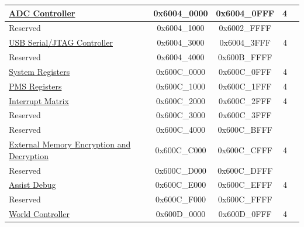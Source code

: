\begin{longtable}[c]{ |p{5cm}|c|c|r|p{1.0cm}| }
                        \hyperref[mod:sensor]{ADC Controller}              & 0x6004\_0000 & 0x6004\_0FFF &   4    &   \\\hline
    \rowcolor{gray!25}  Reserved                    & 0x6004\_1000 & 0x6002\_FFFF &        &   \\\hline
                        \hyperref[mod:usbserialjtag]{USB Serial/JTAG Controller}  & 0x6004\_3000 & 0x6004\_3FFF &   4    &  \\\hline
    \rowcolor{gray!25}  Reserved                    & 0x6004\_4000 & 0x600B\_FFFF &        &   \\\hline
                        
                        \hyperref[mod:sysreg]{System Registers}            & 0x600C\_0000 & 0x600C\_0FFF &   4    &   \\\hline
                        \hyperref[mod:permctrl]{PMS Registers }         & 0x600C\_1000 & 0x600C\_1FFF &   4    &   \\\hline 
                        \hyperref[mod:intmtrx]{Interrupt Matrix}            & 0x600C\_2000 & 0x600C\_2FFF &   4    &   \\\hline
    \rowcolor{gray!25}  Reserved                    & 0x600C\_3000 & 0x600C\_3FFF &        &   \\\hline
    \rowcolor{gray!25}  Reserved              & 0x600C\_4000 & 0x600C\_BFFF &      &   \\\hline
        \hyperref[mod:extmemencr]{External Memory Encryption and Decryption}   & 0x600C\_C000 & 0x600C\_CFFF &   4    &   \\\hline
    \rowcolor{gray!25}  Reserved                    & 0x600C\_D000 & 0x600C\_DFFF &        &   \\\hline
                        \hyperref[mod:dbgassist]{Assist Debug}                & 0x600C\_E000 & 0x600C\_EFFF &   4    &   \\\hline
    \rowcolor{gray!25}  Reserved                    & 0x600C\_F000 & 0x600C\_FFFF &        &   \\\hline
                        \hyperref[mod:wctrl]{World Controller}            & 0x600D\_0000 & 0x600D\_0FFF &   4    &   \\\hline
    
\end{longtable}


